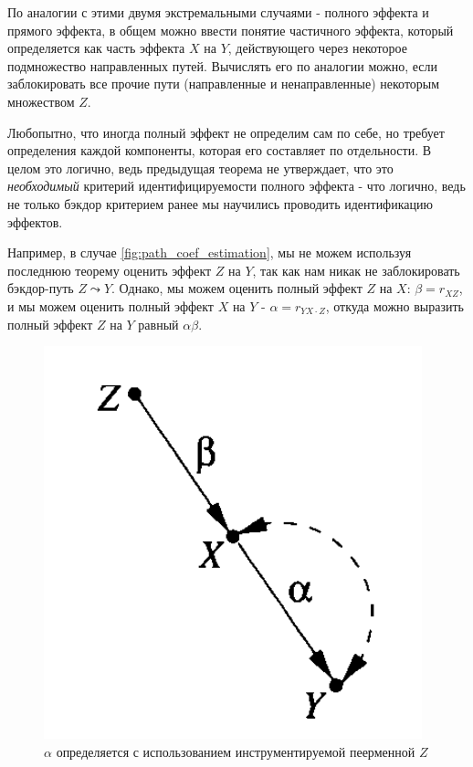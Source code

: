\documentclass[fleqn]{article}
\numberwithin{equation}{section}
\numberwithin{theorem}{section}
\numberwithin{figure}{section}
\numberwithin{lemma}{section}
\numberwithin{corollary}{section}
\begin{document}
По аналогии с этими двумя экстремальными случаями - полного эффекта и прямого эффекта, в общем можно ввести понятие частичного эффекта, который определяется как часть эффекта $X$ на $Y$, действующего через некоторое подмножество направленных путей. Вычислять его по аналогии можно, если заблокировать все прочие пути (направленные и ненаправленные) некоторым множеством $Z$. 

Любопытно, что иногда полный эффект не определим сам по себе, но требует определения каждой компоненты, которая его составляет по отдельности. В целом это логично, ведь предыдущая теорема не утверждает, что это \textit{необходимый} критерий идентифицируемости полного эффекта - что логично, ведь не только бэкдор критерием ранее мы научились проводить идентификацию эффектов.

Например, в случае \ref{fig:path_coef_estimation}, мы не можем используя последнюю теорему оценить эффект $Z$ на $Y$, так как нам никак не заблокировать бэкдор-путь $Z \leadsto Y$. Однако, мы можем оценить полный эффект $Z$ на $X$: $\beta = r_{XZ}$, и мы можем оценить полный эффект $X$ на $Y$ - $\alpha = r_{YX\cdot Z}$, откуда можно выразить полный эффект $Z$ на $Y$ равный $\alpha\beta$.

\begin{figure}[h]
	\begin{center}
		\includegraphics[scale=0.6]{imgs/img33.png}
	\end{center}
	\caption{$\alpha$ определяется с использованием инструментируемой пеерменной $Z$}
	\label{fig:path_coef}
\end{figure}
\end{document}
